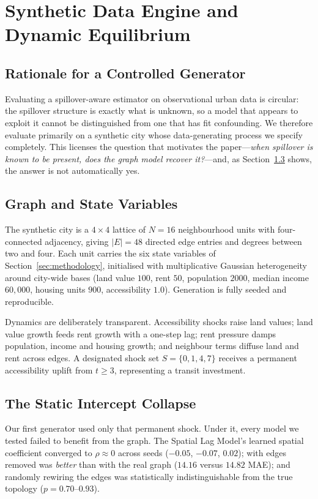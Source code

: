 \section{Synthetic Data Engine and Dynamic Equilibrium}
\label{sec:data-engine}

\subsection{Rationale for a Controlled Generator}

Evaluating a spillover-aware estimator on observational urban data is
circular: the spillover structure is exactly what is unknown, so a model that
appears to exploit it cannot be distinguished from one that has fit
confounding. We therefore evaluate primarily on a synthetic city whose
data-generating process we specify completely. This licenses the question that
motivates the paper---\emph{when spillover is known to be present, does the
graph model recover it?}---and, as Section~\ref{subsec:collapse} shows, the
answer is not automatically yes.

\subsection{Graph and State Variables}

The synthetic city is a $4 \times 4$ lattice of $N = 16$ neighbourhood units
with four-connected adjacency, giving $|E| = 48$ directed edge entries and
degrees between two and four. Each unit carries the six state variables of
Section~\ref{sec:methodology}, initialised with multiplicative Gaussian
heterogeneity around city-wide bases (land value $100$, rent $50$, population
$2000$, median income $60{,}000$, housing units $900$, accessibility $1.0$).
Generation is fully seeded and reproducible.

Dynamics are deliberately transparent. Accessibility shocks raise land values;
land value growth feeds rent growth with a one-step lag; rent pressure damps
population, income and housing growth; and neighbour terms diffuse land and
rent across edges. A designated shock set $S = \{0,1,4,7\}$ receives a permanent
accessibility uplift from $t \geq 3$, representing a transit investment.

\subsection{The Static Intercept Collapse}
\label{subsec:collapse}

Our first generator used only that permanent shock. Under it, every model we
tested failed to benefit from the graph. The Spatial Lag Model's learned
spatial coefficient converged to $\rho \approx 0$ across seeds
($-0.05$, $-0.07$, $0.02$); \CGCEN{} with edges removed was \emph{better} than
with the real graph ($14.16$ versus $14.82$ MAE); and randomly rewiring the
edges was statistically indistinguishable from the true topology
($p = 0.70$--$0.93$).

